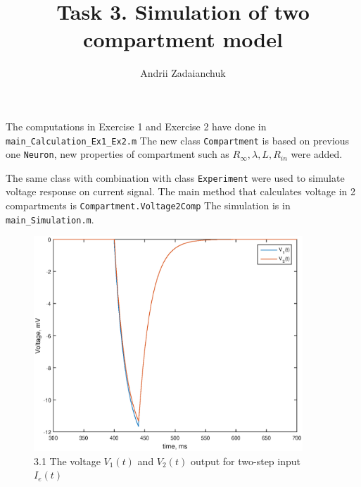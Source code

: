 \documentclass[]{report}
\title{Task 3. Simulation of two compartment model}
\author{Andrii Zadaianchuk}
\begin{document}
\maketitle
The computations in Exercise 1 and Exercise 2 have done in \texttt{main\_Calculation\_Ex1\_Ex2.m}
The new class \texttt{Compartment} is based on previous one \texttt{Neuron}, new properties of compartment such as $R_{\infty}, \lambda, L, R_{in}$ were added. 

The same class with combination with class \texttt{Experiment} were used to simulate voltage response on current signal. The main method that calculates voltage in 2 compartments is \texttt{Compartment.Voltage2Comp}
The simulation is in \texttt{main\_Simulation.m}.
\begin{figure}[h!]
	\centering
	\includegraphics[width=0.9\textwidth]{exp1_1.eps}
	\caption*{3.1 The voltage $V_1(t)$ and $V_2(t)$  output for two-step input $I_e(t)$}
	\label{fig:exp1}
\end{figure}
\end{document}
